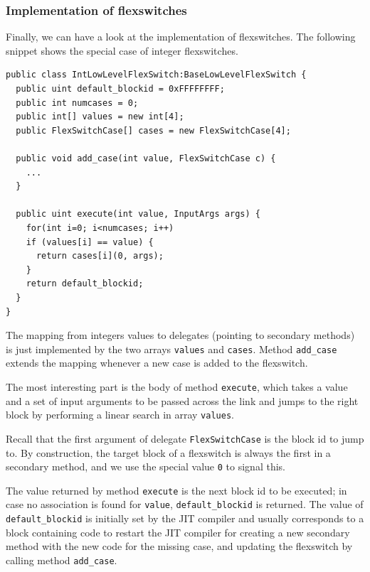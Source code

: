 \subsubsection{Implementation of flexswitches}
Finally, we can have a look at the implementation of flexswitches.
The following snippet shows the special case of integer flexswitches.
\begin{small}
\begin{lstlisting}[language={[Sharp]C}] 
public class IntLowLevelFlexSwitch:BaseLowLevelFlexSwitch {
  public uint default_blockid = 0xFFFFFFFF;
  public int numcases = 0;
  public int[] values = new int[4];
  public FlexSwitchCase[] cases = new FlexSwitchCase[4];

  public void add_case(int value, FlexSwitchCase c) {
    ...
  }

  public uint execute(int value, InputArgs args) {
    for(int i=0; i<numcases; i++)
    if (values[i] == value) {
      return cases[i](0, args);
    }
    return default_blockid;
  }
}
\end{lstlisting}
\end{small}
The mapping from integers values to delegates (pointing to secondary
methods) is just implemented by the two arrays \lstinline{values} and
\lstinline{cases}. Method \lstinline{add_case} extends the mapping
whenever a new case is added to the flexswitch.
  
The most interesting part is the body of method \lstinline{execute},
which takes a value and a set of input arguments to be passed across
the link and jumps to the right block by performing a linear search in
array \lstinline{values}.

Recall that the first argument of delegate \lstinline{FlexSwitchCase} is the
block id to jump to. By construction, the target block of a flexswitch is
always the first in a secondary method, and we use the special value
\lstinline{0} to signal this.

The value returned by method \lstinline{execute} is the next block id
to be executed; 
in case no association is found for \lstinline{value},
\lstinline{default_blockid} is returned. The value of
\lstinline{default_blockid} is initially set by the JIT compiler and
usually corresponds to a block containing code to restart the JIT
compiler for creating a new secondary method with the new code for the
missing case, and updating the flexswitch by calling method
\lstinline{add_case}.

